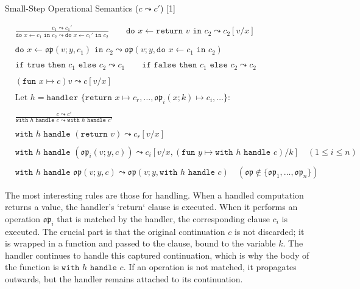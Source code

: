 \documentclass{article}
\begin{document}
\begin{table}[h!]
\centering
\caption{Small-Step Operational Semantics ($c \leadsto c'$) [1]}
\label{tab:semantics}
\begin{align*}
    & \frac{c_1 \leadsto c_1'}{\texttt{do } x \leftarrow c_1 \texttt{ in } c_2 \leadsto \texttt{do } x \leftarrow c_1' \texttt{ in } c_2}
    \qquad
    \texttt{do } x \leftarrow \texttt{return } v \texttt{ in } c_2 \leadsto c_2[v/x] \\
    \\
    & \texttt{do } x \leftarrow \mathfrak{op}(v;y,c_1) \texttt{ in } c_2 \leadsto \mathfrak{op}(v;y, \texttt{do } x \leftarrow c_1 \texttt{ in } c_2) \\
    \\
    & \texttt{if true then } c_1 \texttt{ else } c_2 \leadsto c_1
    \qquad
    \texttt{if false then } c_1 \texttt{ else } c_2 \leadsto c_2 \\
    \\
    & (\texttt{fun } x \mapsto c)v \leadsto c[v/x] \\
    \\
    & \text{Let } h = \texttt{handler } \{\texttt{return } x \mapsto c_r, \dots, \mathfrak{op}_i(x;k) \mapsto c_i, \dots \}: \\
    \\
    & \frac{c \leadsto c'}{\texttt{with } h \texttt{ handle } c \leadsto \texttt{with } h \texttt{ handle } c'} \\
    \\
    & \texttt{with } h \texttt{ handle } (\texttt{return } v) \leadsto c_r[v/x] \\
    \\
    & \texttt{with } h \texttt{ handle } (\mathfrak{op}_i(v;y,c)) \leadsto c_i[v/x, (\texttt{fun } y \mapsto \texttt{with } h \texttt{ handle } c)/k] \quad (1 \le i \le n) \\
    \\
    & \texttt{with } h \texttt{ handle } \mathfrak{op}(v;y,c) \leadsto \mathfrak{op}(v;y, \texttt{with } h \texttt{ handle } c) \quad (\mathfrak{op} \notin \{\mathfrak{op}_1, \dots, \mathfrak{op}_n\})
\end{align*}
\end{table}

The most interesting rules are those for handling. When a handled computation returns a value, the handler's `return` clause is executed. When it performs an operation $\mathfrak{op}_i$ that is matched by the handler, the corresponding clause $c_i$ is executed. The crucial part is that the original continuation $c$ is not discarded; it is wrapped in a function and passed to the clause, bound to the variable $k$. The handler continues to handle this captured continuation, which is why the body of the function is $\texttt{with } h \texttt{ handle } c$. If an operation is not matched, it propagates outwards, but the handler remains attached to its continuation.
\end{document}

